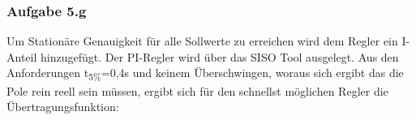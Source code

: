 \documentclass[10pt]{scrartcl}
\begin{document}
\subsubsection{Aufgabe 5.g}	
Um Stationäre Genauigkeit für alle Sollwerte zu erreichen wird dem Regler ein I-Anteil hinzugefügt. Der PI-Regler wird über das SISO Tool ausgelegt. Aus den Anforderungen t\textsubscript{5\%}=0,4s und keinem Überschwingen, woraus sich ergibt das die Pole rein reell sein müssen, ergibt sich für den schnellst möglichen Regler die Übertragungsfunktion:
\end{document}
